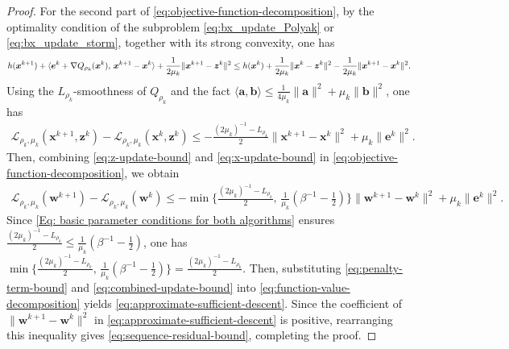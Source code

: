 \documentclass[10pt,a4paper]{amsart}
\newcommand{\ba}{\bm{a}}
\newcommand{\bb}{\bm{b}}
\newcommand{\be}{\bm{e}}
\newcommand{\bw}{\bm{w}}
\newcommand{\bx}{\bm{x}}
\newcommand{\bz}{\bm{z}}
\newcommand{\calL}{\mathcal{L}}
\begin{document}
\begin{proof}
For the second part of \eqref{eq:objective-function-decomposition}, by the optimality condition of the subproblem \eqref{eq:bx_update_Polyak} or \eqref{eq:bx_update_storm}, together with its strong convexity, one has
\begin{align}
h(\bx^{k+1})
+ \langle \be^{k} + \nabla Q_{\rho_k}(\bx^{k}),\, \bx^{k+1}-\bx^{k}\rangle
   + \frac{1}{2\mu_k}\|\bx^{k+1}-\bz^{k}\|^{2} \le h(\bx^{k}) + \frac{1}{2\mu_k}\|\bx^{k}-\bz^{k}\|^{2}
   - \frac{1}{2\mu_k}\|\bx^{k+1}-\bx^{k}\|^{2}. \notag
\end{align}
Using the $L_{\rho_k}$-smoothness of $Q_{\rho_k}$ and the fact
$\langle \ba,\bb\rangle \le \tfrac{1}{4\mu_k}\|\ba\|^{2}+ \mu_k\|\bb\|^{2}$, one has
\begin{align}
\calL_{\rho_k,\mu_k}(\bx^{k+1},\bz^{k})
 - \calL_{\rho_k,\mu_k}(\bx^{k},\bz^{k})
\le -\frac{(2\mu_k)^{-1}- L_{\rho_k}}{2}\|\bx^{k+1}-\bx^{k}\|^{2}
+ \mu_k\|\be^{k}\|^{2}.
\label{eq:x-update-bound}
\end{align}
Then, combining \eqref{eq:z-update-bound} and \eqref{eq:x-update-bound} in
\eqref{eq:objective-function-decomposition}, we obtain
\begin{align}
\calL_{\rho_k,\mu_k}(\bw^{k+1}) - \calL_{\rho_k,\mu_k}(\bw^{k})
\le  - \min\{\frac{(2\mu_k)^{-1}-L_{\rho_k}}{2},\,
\frac{1}{\mu_k}(\beta^{-1}-\tfrac{1}{2})\}
\|\bw^{k+1}-\bw^{k}\|^{2}  + \mu_k\|\be^{k}\|^{2}.
\label{eq:combined-update-bound}
\end{align}
Since \eqref{Eq: basic parameter conditions for both algorithms} ensures $\frac{(2\mu_k)^{-1} - L_{\rho_k}}{2} \le \frac{1}{\mu_k}(\beta^{-1}-\tfrac{1}{2})$, one has \( \min\{\frac{(2\mu_k)^{-1}-L_{\rho_k}}{2},\,
\frac{1}{\mu_k}(\beta^{-1}-\tfrac{1}{2})\} = \frac{(2\mu_k)^{-1}-L_{\rho_k}}{2}\). Then, substituting \eqref{eq:penalty-term-bound} and \eqref{eq:combined-update-bound} into
\eqref{eq:function-value-decomposition} yields \eqref{eq:approximate-sufficient-descent}. Since the coefficient of $\| \bw^{k+1}- \bw^{k}\|^{2}$ in \eqref{eq:approximate-sufficient-descent} is positive, rearranging this inequality gives \eqref{eq:sequence-residual-bound}, completing the proof.
\end{proof}
\end{document}
